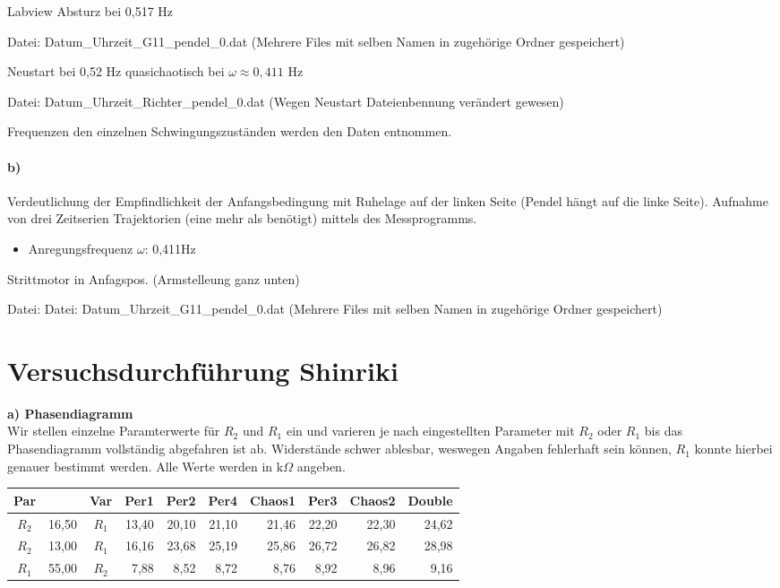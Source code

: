 Labview Absturz bei 0,517 Hz 

Datei: Datum\_Uhrzeit\_G11\_pendel\_0.dat (Mehrere Files mit selben Namen in zugehörige Ordner gespeichert)

Neustart bei 0,52 Hz
quasichaotisch bei $\omega\approx0,411$ Hz

Datei: Datum\_Uhrzeit\_Richter\_pendel\_0.dat (Wegen Neustart Dateienbennung verändert gewesen)

Frequenzen den einzelnen Schwingungszuständen werden den Daten entnommen.

\paragraph{b)}
Verdeutlichung der Empfindlichkeit der Anfangsbedingung mit Ruhelage auf der linken Seite (Pendel hängt auf die linke Seite). Aufnahme von drei Zeitserien Trajektorien (eine mehr als benötigt) mittels des Messprogramms.
\begin{itemize}
    \item Anregungsfrequenz $\omega$: 0,411Hz
\end{itemize}
Strittmotor in Anfagspos. (Armstelleung ganz unten)

Datei: Datei: Datum\_Uhrzeit\_G11\_pendel\_0.dat (Mehrere Files mit selben Namen in zugehörige Ordner gespeichert)

\section{Versuchsdurchführung Shinriki}
\label{sec:versuchShin}
\textbf{a) Phasendiagramm}\\
Wir stellen einzelne Paramterwerte für $R_2$ und $R_1$ ein und varieren je nach eingestellten Parameter mit $R_2$ oder $R_1$ bis das Phasendiagramm vollständig abgefahren ist ab. Widerstände schwer ablesbar, weswegen Angaben fehlerhaft sein können, $R_1$ konnte hierbei genauer bestimmt werden. Alle Werte werden in $\text{k}\Omega$ angeben.\\
\begin{tabular}{c  r| c  r  r  r  r  r  r  r}
    Par &  & Var & Per1 & Per2 & Per4 & Chaos1 & Per3 & Chaos2 & Double\\
    \hline
    $R_2$ & 16,50 & $R_1$ & 13,40 & 20,10 & 21,10 & 21,46 & 22,20 & 22,30 & 24,62\\
    $R_2$ & 13,00 & $R_1$ & 16,16 & 23,68 & 25,19 & 25,86 & 26,72 & 26,82 & 28,98\\
    $R_1$ & 55,00 & $R_2$ & 7,88  & 8,52 & 8,72 & 8,76 & 8,92 & 8,96 & 9,16\\
\end{tabular}\\

